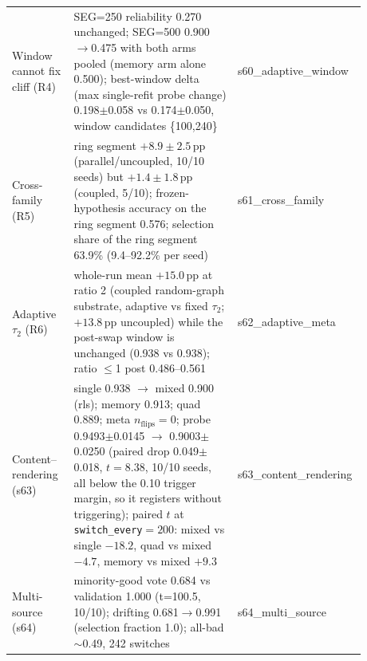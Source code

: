 \documentclass[preprint,12pt]{elsarticle}
\begin{document}
\begin{longtable}{@{}>{\footnotesize}p{0.17\linewidth}>{\footnotesize}p{0.45\linewidth}>{\footnotesize}p{0.26\linewidth}@{}}
Window cannot fix cliff (R4) & SEG=250 reliability 0.270 unchanged; SEG=500 0.900$\to$0.475 with both arms pooled (memory arm alone 0.500); best-window delta (max single-refit probe change) 0.198$\pm$0.058 vs 0.174$\pm$0.050, window candidates \{100,240\} & s60\_adaptive\_window \\
Cross-family (R5) & ring segment $+8.9\pm2.5$\,pp (parallel/uncoupled, 10/10 seeds) but $+1.4\pm1.8$\,pp (coupled, 5/10); frozen-hypothesis accuracy on the ring segment 0.576; selection share of the ring segment 63.9\% (9.4--92.2\% per seed) & s61\_cross\_family \\
Adaptive $\tau_2$ (R6) & whole-run mean $+15.0$\,pp at ratio 2 (coupled random-graph substrate, adaptive vs fixed $\tau_2$; $+13.8$\,pp uncoupled) while the post-swap window is unchanged (0.938 vs 0.938); ratio $\le$1 post 0.486--0.561 & s62\_adaptive\_meta \\
Content--rendering (s63) & single 0.938 $\to$ mixed 0.900 (rls); memory 0.913; quad 0.889; meta $n_{\mathrm{flips}}{=}0$; probe 0.9493$\pm$0.0145 $\to$ 0.9003$\pm$0.0250 (paired drop 0.049$\pm$0.018, $t=8.38$, 10/10 seeds, all below the 0.10 trigger margin, so it registers without triggering); paired $t$ at \texttt{switch\_every}$=200$: mixed vs single $-18.2$, quad vs mixed $-4.7$, memory vs mixed $+9.3$ & s63\_content\_rendering \\
Multi-source (s64) & minority-good vote 0.684 vs validation 1.000 (t=100.5, 10/10); drifting 0.681$\to$0.991 (selection fraction 1.0); all-bad $\sim$0.49, 242 switches & s64\_multi\_source \\
\end{longtable}
\end{document}
